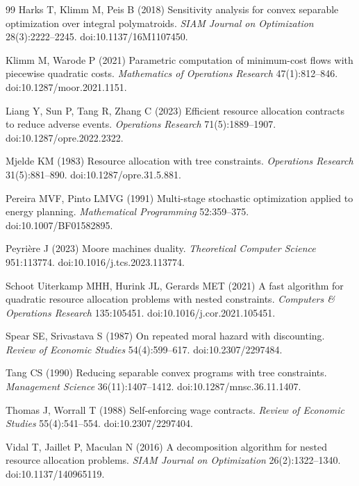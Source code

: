 \begin{thebibliography}{99}
Harks T, Klimm M, Peis B (2018) Sensitivity analysis for convex separable optimization over integral polymatroids. \emph{SIAM Journal on Optimization} 28(3):2222--2245. doi:10.1137/16M1107450.

Klimm M, Warode P (2021) Parametric computation of minimum-cost flows with piecewise quadratic costs. \emph{Mathematics of Operations Research} 47(1):812--846. doi:10.1287/moor.2021.1151.

Liang Y, Sun P, Tang R, Zhang C (2023) Efficient resource allocation contracts to reduce adverse events. \emph{Operations Research} 71(5):1889--1907. doi:10.1287/opre.2022.2322.

Mjelde KM (1983) Resource allocation with tree constraints. \emph{Operations Research} 31(5):881--890. doi:10.1287/opre.31.5.881.

Pereira MVF, Pinto LMVG (1991) Multi-stage stochastic optimization applied to energy planning. \emph{Mathematical Programming} 52:359--375. doi:10.1007/BF01582895.

Peyri\`ere J (2023) Moore machines duality. \emph{Theoretical Computer Science} 951:113774. doi:10.1016/j.tcs.2023.113774.

Schoot Uiterkamp MHH, Hurink JL, Gerards MET (2021) A fast algorithm for quadratic resource allocation problems with nested constraints. \emph{Computers \& Operations Research} 135:105451. doi:10.1016/j.cor.2021.105451.

Spear SE, Srivastava S (1987) On repeated moral hazard with discounting. \emph{Review of Economic Studies} 54(4):599--617. doi:10.2307/2297484.

Tang CS (1990) Reducing separable convex programs with tree constraints. \emph{Management Science} 36(11):1407--1412. doi:10.1287/mnsc.36.11.1407.

Thomas J, Worrall T (1988) Self-enforcing wage contracts. \emph{Review of Economic Studies} 55(4):541--554. doi:10.2307/2297404.

Vidal T, Jaillet P, Maculan N (2016) A decomposition algorithm for nested resource allocation problems. \emph{SIAM Journal on Optimization} 26(2):1322--1340. doi:10.1137/140965119.


\end{thebibliography}
